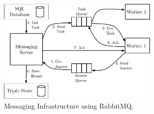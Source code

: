 \begin{figure}[ht]
  \begin{center}
  \includegraphics[width=0.7\textwidth]{images/rabbit_mq.pdf}
  \end{center}
  \caption{Messaging Infrastructure using RabbitMQ.}
  \label{fig_messaging_infrastructure}
\end{figure}